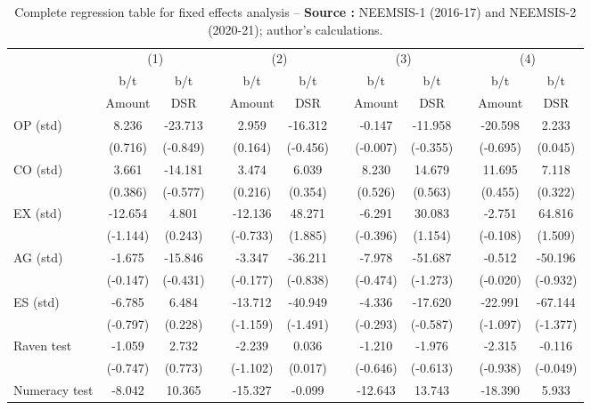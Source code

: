 {\tiny\tabcolsep=0pt
    \begin{longtable}{@{\extracolsep{\fill}}lccccccccccc}
	\caption{Complete regression table for fixed effects analysis --  \textbf{Source :} NEEMSIS-1 (2016-17) and NEEMSIS-2 (2020-21); author's calculations.} \\
    \toprule
      & \multicolumn{2}{c}{(1)} &   & \multicolumn{2}{c}{(2)} &   & \multicolumn{2}{c}{(3)} &   & \multicolumn{2}{c}{(4)} \\
\cmidrule{2-3}\cmidrule{5-6}\cmidrule{8-9}\cmidrule{11-12}      & b/t & b/t &   & b/t & b/t &   & b/t & b/t &   & b/t & b/t \\
      & Amount & DSR &   & Amount & DSR &   & Amount & DSR &   & Amount & DSR \\
    \midrule
    OP (std) & 8.236 & -23.713 &   & 2.959 & -16.312 &   & -0.147 & -11.958 &   & -20.598 & 2.233 \\
      & (0.716) & (-0.849) &   & (0.164) & (-0.456) &   & (-0.007) & (-0.355) &   & (-0.695) & (0.045) \\
    CO (std) & 3.661 & -14.181 &   & 3.474 & 6.039 &   & 8.230 & 14.679 &   & 11.695 & 7.118 \\
      & (0.386) & (-0.577) &   & (0.216) & (0.354) &   & (0.526) & (0.563) &   & (0.455) & (0.322) \\
    EX (std) & -12.654 & 4.801 &   & -12.136 & 48.271 &   & -6.291 & 30.083 &   & -2.751 & 64.816 \\
      & (-1.144) & (0.243) &   & (-0.733) & (1.885) &   & (-0.396) & (1.154) &   & (-0.108) & (1.509) \\
    AG (std) & -1.675 & -15.846 &   & -3.347 & -36.211 &   & -7.978 & -51.687 &   & -0.512 & -50.196 \\
      & (-0.147) & (-0.431) &   & (-0.177) & (-0.838) &   & (-0.474) & (-1.273) &   & (-0.020) & (-0.932) \\
    ES (std) & -6.785 & 6.484 &   & -13.712 & -40.949 &   & -4.336 & -17.620 &   & -22.991 & -67.144 \\
      & (-0.797) & (0.228) &   & (-1.159) & (-1.491) &   & (-0.293) & (-0.587) &   & (-1.097) & (-1.377) \\
    Raven test & -1.059 & 2.732 &   & -2.239 & 0.036 &   & -1.210 & -1.976 &   & -2.315 & -0.116 \\
      & (-0.747) & (0.773) &   & (-1.102) & (0.017) &   & (-0.646) & (-0.613) &   & (-0.938) & (-0.049) \\
    Numeracy test & -8.042 & 10.365 &   & -15.327 & -0.099 &   & -12.643 & 13.743 &   & -18.390 & 5.933 \\

\end{longtable}}
